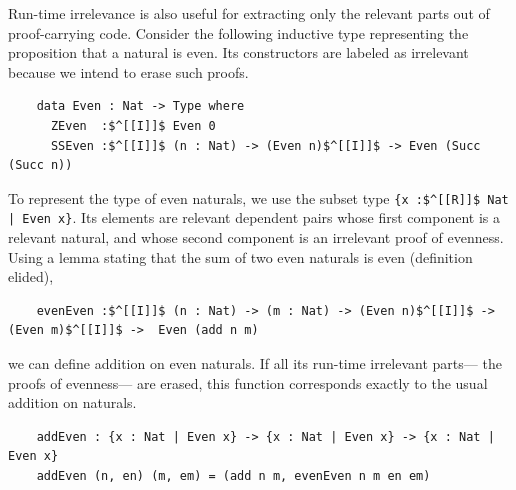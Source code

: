 \documentclass[acmsmall]{acmart}
\newcommand{\scw}[1]{}
\newcommand{\jc}[1]{}
\begin{document}

Run-time irrelevance is also useful for extracting only the relevant parts out of proof-carrying code.
Consider the following inductive type representing the proposition that a natural is even.
Its constructors are labeled as irrelevant because we intend to erase such proofs.

\begin{lstlisting}
    data Even : Nat -> Type where
      ZEven  :$^[[I]]$ Even 0
      SSEven :$^[[I]]$ (n : Nat) -> (Even n)$^[[I]]$ -> Even (Succ (Succ n))
\end{lstlisting}

To represent the type of even naturals,
we use the subset type \lstinline!{x :$^[[R]]$ Nat | Even x}!.
Its elements are relevant dependent pairs whose first component is a relevant natural,
and whose second component is an irrelevant proof of evenness.
Using a lemma stating that the sum of two even naturals is even (definition elided),

\begin{lstlisting}
    evenEven :$^[[I]]$ (n : Nat) -> (m : Nat) -> (Even n)$^[[I]]$ -> (Even m)$^[[I]]$ ->  Even (add n m)
\end{lstlisting}

we can define addition on even naturals.
If all its run-time irrelevant parts---%
the proofs of evenness---%
are erased, this function corresponds exactly to the usual addition on naturals.
\scw{why do we say that we are using pattern matching? shouldn't that be implied by datatypes?
And should we say that our implementation doesn't do type inference?}
\jc{this is pattern matching as in I'm writing the arguments of functions
to the left of the equals, which the implementation doesn't have.
I removed the comment because pattern-matching notation is so common
people probably aren't even going to notice they're reading it.}

\begin{lstlisting}
    addEven : {x : Nat | Even x} -> {x : Nat | Even x} -> {x : Nat | Even x}
    addEven (n, en) (m, em) = (add n m, evenEven n m en em)
\end{lstlisting}
\end{document}
